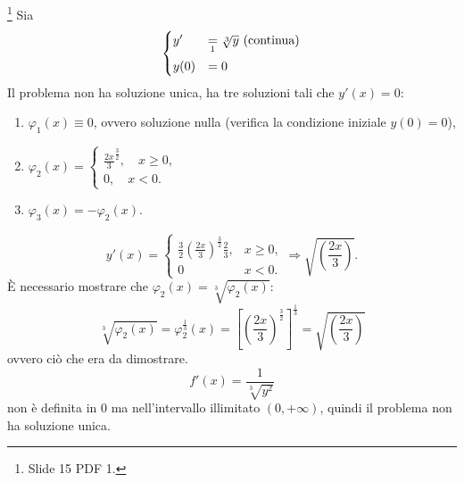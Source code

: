 \begin{example}
    \footnote{Slide 15 PDF 1.} Sia
    \begin{equation*}
        \begin{cases}
            y' &\underset{\footnotemark}{=} \sqrt[3]{y} \text{ (continua)}\\
            y(0) &=0
        \end{cases}
    \end{equation*}
    Il problema non ha soluzione unica, ha tre soluzioni tali che $y'(x)=0$:
    \begin{enumerate}
        \item $\varphi_1(x)\equiv 0$, ovvero soluzione nulla (verifica la condizione iniziale $y(0)=0$),
        \item $\varphi_2(x)=
        \begin{cases}
            \frac{2x}{3}^{\frac{3}{2}},\quad x\geq 0,\\
            0,\quad x<0.
        \end{cases}$
        \item $\varphi_3(x)=-\varphi_2(x).$
    \end{enumerate}
    \begin{equation*}
        y'(x) =
        \begin{cases}
            \frac{3}{2}\left(\frac{2x}{3}\right)^{\frac{3}{2}}\frac{2}{3}, &x\geq 0,\\
            0 & x<0.
        \end{cases}\Rightarrow \sqrt{\left(\frac{2x}{3}\right)}.
    \end{equation*}
    È necessario mostrare che $\varphi_2(x)=\sqrt[3]{\varphi_2(x)}$:
    \begin{equation*}
        \sqrt[3]{\varphi_2(x)}=\varphi_2^{\frac{1}{3}}(x)=\left[\left(\frac{2x}{3}\right)^{\frac{3}{2}}\right]^{\frac{1}{3}}=\sqrt{\left(\frac{2x}{3}\right)}
    \end{equation*}
    ovvero ciò che era da dimostrare.
    \begin{equation*}
        f'(x)=\frac{1}{\sqrt[3]{y^2}}
    \end{equation*}
    non è definita in 0 ma nell'intervallo illimitato $(0,+\infty)$, quindi il problema non ha soluzione unica.
\end{example}


